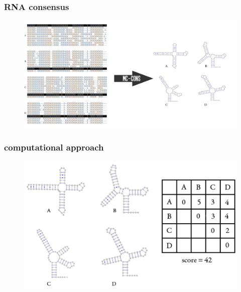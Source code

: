 \documentclass{beamer}
\begin{document}
\begin{frame}
	\frametitle{RNA consensus}
	\begin{figure}
	\centering
	\includegraphics[scale=0.81]{figs/problem_setting}
	\end{figure}
\end{frame}




\begin{frame}
	\frametitle{computational approach}

	\begin{figure}
		\centering
		\includegraphics[scale=1.6]{figs/consensus}
	\end{figure}
	

\end{frame}
\end{document}
